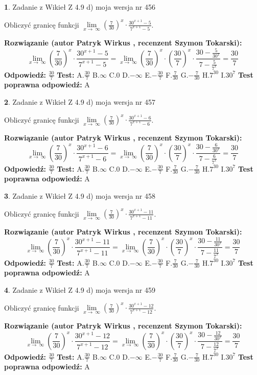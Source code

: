 \documentclass[12pt, a4paper]{article}
\theoremstyle{definition} %
\newtheorem{zad}{}
\newcommand{\zadStart}[1]{\begin{zad}#1\newline}
\newcommand{\zadStop}{\end{zad}}
\newcommand{\rozwStart}[2]{\noindent \textbf{Rozwiązanie (autor #1 , recenzent #2): }\newline}
\newcommand{\rozwStop}{\newline}
\newcommand{\odpStart}{\noindent \textbf{Odpowiedź:}\newline}
\newcommand{\odpStop}{\newline}
\newcommand{\testStart}{\noindent \textbf{Test:}\newline}
\newcommand{\testStop}{\newline}
\newcommand{\kluczStart}{\noindent \textbf{Test poprawna odpowiedź:}\newline}
\newcommand{\kluczStop}{\newline}
\begin{document}
\zadStart{Zadanie z Wikieł Z 4.9 d) moja wersja nr 456}


Obliczyć granicę funkcji  $\lim\limits_{x\to\ \infty}(\frac{7}{30})^{x}\cdot\frac{30^{x+1}-5}{7^{x+1}-5}$.
\zadStop
\rozwStart{Patryk Wirkus}{Szymon Tokarski}
$$\lim\limits_{x\to\ \infty}(\frac{7}{30})^{x}\cdot\frac{30^{x+1}-5}{7^{x+1}-5}=\lim\limits_{x\to\ \infty}(\frac{7}{30})^{x}\cdot(\frac{30}{7})^{x} \cdot \frac{30-\frac{5}{30^{x}}}{7-\frac{5}{7^{x}}} = \frac{30}{7}$$
\rozwStop
\odpStart
$\frac{30}{7}$
\odpStop
\testStart
A.$\frac{30}{7}$ B.$\infty$ C.$0$ D.$-\infty$ E.$-\frac{30}{7}$
F.$\frac{7}{30}$ G.$-\frac{7}{30}$
H.$7^{30}$
I.$30^{7}$
\testStop
\kluczStart
A
\kluczStop



\zadStart{Zadanie z Wikieł Z 4.9 d) moja wersja nr 457}


Obliczyć granicę funkcji  $\lim\limits_{x\to\ \infty}(\frac{7}{30})^{x}\cdot\frac{30^{x+1}-6}{7^{x+1}-6}$.
\zadStop
\rozwStart{Patryk Wirkus}{Szymon Tokarski}
$$\lim\limits_{x\to\ \infty}(\frac{7}{30})^{x}\cdot\frac{30^{x+1}-6}{7^{x+1}-6}=\lim\limits_{x\to\ \infty}(\frac{7}{30})^{x}\cdot(\frac{30}{7})^{x} \cdot \frac{30-\frac{6}{30^{x}}}{7-\frac{6}{7^{x}}} = \frac{30}{7}$$
\rozwStop
\odpStart
$\frac{30}{7}$
\odpStop
\testStart
A.$\frac{30}{7}$ B.$\infty$ C.$0$ D.$-\infty$ E.$-\frac{30}{7}$
F.$\frac{7}{30}$ G.$-\frac{7}{30}$
H.$7^{30}$
I.$30^{7}$
\testStop
\kluczStart
A
\kluczStop



\zadStart{Zadanie z Wikieł Z 4.9 d) moja wersja nr 458}


Obliczyć granicę funkcji  $\lim\limits_{x\to\ \infty}(\frac{7}{30})^{x}\cdot\frac{30^{x+1}-11}{7^{x+1}-11}$.
\zadStop
\rozwStart{Patryk Wirkus}{Szymon Tokarski}
$$\lim\limits_{x\to\ \infty}(\frac{7}{30})^{x}\cdot\frac{30^{x+1}-11}{7^{x+1}-11}=\lim\limits_{x\to\ \infty}(\frac{7}{30})^{x}\cdot(\frac{30}{7})^{x} \cdot \frac{30-\frac{11}{30^{x}}}{7-\frac{11}{7^{x}}} = \frac{30}{7}$$
\rozwStop
\odpStart
$\frac{30}{7}$
\odpStop
\testStart
A.$\frac{30}{7}$ B.$\infty$ C.$0$ D.$-\infty$ E.$-\frac{30}{7}$
F.$\frac{7}{30}$ G.$-\frac{7}{30}$
H.$7^{30}$
I.$30^{7}$
\testStop
\kluczStart
A
\kluczStop



\zadStart{Zadanie z Wikieł Z 4.9 d) moja wersja nr 459}


Obliczyć granicę funkcji  $\lim\limits_{x\to\ \infty}(\frac{7}{30})^{x}\cdot\frac{30^{x+1}-12}{7^{x+1}-12}$.
\zadStop
\rozwStart{Patryk Wirkus}{Szymon Tokarski}
$$\lim\limits_{x\to\ \infty}(\frac{7}{30})^{x}\cdot\frac{30^{x+1}-12}{7^{x+1}-12}=\lim\limits_{x\to\ \infty}(\frac{7}{30})^{x}\cdot(\frac{30}{7})^{x} \cdot \frac{30-\frac{12}{30^{x}}}{7-\frac{12}{7^{x}}} = \frac{30}{7}$$
\rozwStop
\odpStart
$\frac{30}{7}$
\odpStop
\testStart
A.$\frac{30}{7}$ B.$\infty$ C.$0$ D.$-\infty$ E.$-\frac{30}{7}$
F.$\frac{7}{30}$ G.$-\frac{7}{30}$
H.$7^{30}$
I.$30^{7}$
\testStop
\kluczStart
A
\kluczStop
\end{document}
